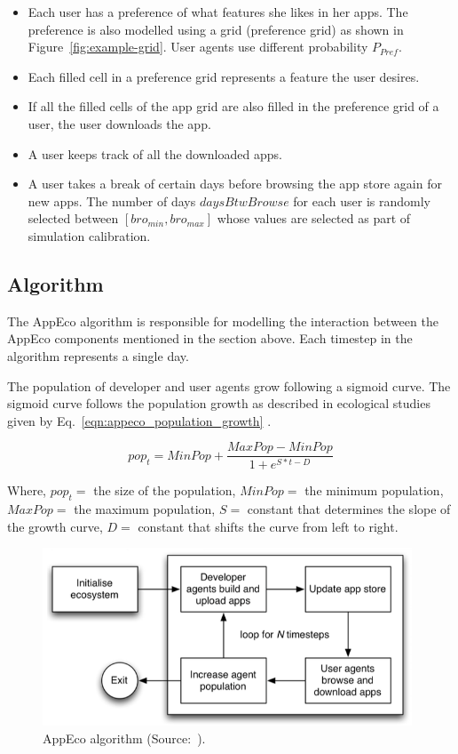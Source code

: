 \begin{itemize}
  \item Each user has a preference of what features she likes in her apps. The preference is also modelled using a grid (preference grid) as shown in Figure~\ref{fig:example-grid}. User agents use different probability $P_{Pref}$.
  \item Each filled cell in a preference grid represents a feature the user desires.
  \item If all the filled cells of the app grid are also filled in the preference grid of a user, the user downloads the app.
  \item A user keeps track of all the downloaded apps.
  \item A user takes a break of certain days before browsing the app store again for new apps. The number of days $daysBtwBrowse$ for each user is randomly selected between $[bro_{min}, bro_{max}]$ whose values are selected as part of simulation calibration.
\end{itemize}

\subsection{Algorithm}

The AppEco algorithm is responsible for modelling the interaction between the AppEco components mentioned in the section above. Each timestep in the algorithm represents a single day.

The population of developer and user agents grow following a sigmoid curve. The sigmoid curve follows the population growth as described in ecological studies given by Eq.~\ref{eqn:appeco_population_growth} \cite{lim2012successful}.

\begin{equation}\label{eqn:appeco_population_growth}
  pop_t=MinPop+\frac{MaxPop-MinPop}{1+e^{S*t-D}}
\end{equation}

Where, 
$pop_t  =$ the size of the population,
$MinPop =$ the minimum population,
$MaxPop =$ the maximum population,
$S =$ constant that determines the slope of the growth curve,
$D =$ constant that shifts the curve from left to right.


\begin{figure}[!htb]
  \centering
  \includegraphics[width=11cm]{figures/appeco_algorithm.png}
  \caption{AppEco algorithm (Source:~\cite{lim2012successful}).}
  \label{fig:appeco-algorithm}
\end{figure}

